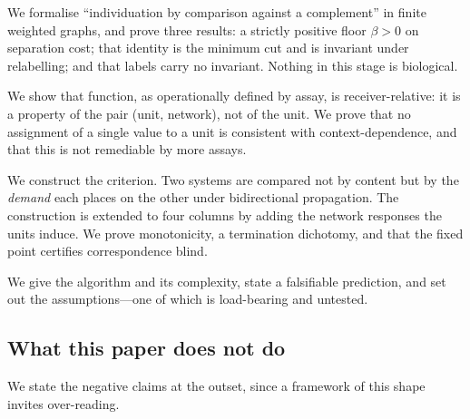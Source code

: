 \documentclass[11pt,twocolumn,a4paper]{article}
\theoremstyle{definition}
\theoremstyle{remark}
\newcommand{\flo}{\beta}
\begin{document}
\begin{description}[leftmargin=1.4em,style=nextline]
  \item[Stage 1 (\Cref{sec:graph,sec:floor,sec:identity}).] We formalise
  ``individuation by comparison against a complement'' in finite weighted
  graphs, and prove three results: a strictly positive floor $\flo>0$ on
  separation cost; that identity is the minimum cut and is invariant under
  relabelling; and that labels carry no invariant. Nothing in this stage
  is biological.

  \item[Stage 2 (\Cref{sec:function}).] We show that function, as
  operationally defined by assay, is receiver-relative: it is a property
  of the pair (unit, network), not of the unit. We prove that no
  assignment of a single value to a unit is consistent with
  context-dependence, and that this is not remediable by more assays.

  \item[Stage 3 (\Cref{sec:relaxation,sec:fourcolumn}).] We construct the
  criterion. Two systems are compared not by content but by the
  \emph{demand} each places on the other under bidirectional propagation.
  The construction is extended to four columns by adding the network
  responses the units induce. We prove monotonicity, a termination
  dichotomy, and that the fixed point certifies correspondence blind.

  \item[Stage 4 (\Cref{sec:algorithm,sec:predictions,sec:limits}).] We
  give the algorithm and its complexity, state a falsifiable prediction,
  and set out the assumptions---one of which is load-bearing and untested.
\end{description}

\subsection{What this paper does not do}
\label{sec:notdo}

We state the negative claims at the outset, since a framework of this
shape invites over-reading.
\end{document}
